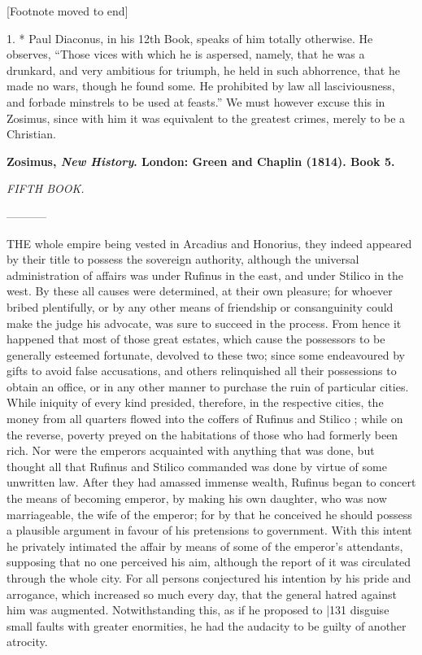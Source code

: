 [Footnote moved to end]

1. * Paul Diaconus, in his 12th Book, speaks of him totally otherwise. He observes, ``Those vices with which he is aspersed, namely, that he was a drunkard, and very ambitious for triumph, he held in such abhorrence, that he made no wars, though he found some. He prohibited by law all lasciviousness, and forbade minstrels to be used at feasts.'' We must however excuse this in Zosimus, since with him it was equivalent to the greatest crimes, merely to be a Christian.


\textbf{Zosimus, \emph{New History}. London: Green and Chaplin
(1814). Book 5.}

\emph{FIFTH BOOK.}

-----------

THE whole empire being vested in Arcadius and Honorius, they indeed appeared by their title to possess the sovereign authority, although the universal administration of affairs was under Rufinus in the east, and under Stilico in the west. By these all causes were determined, at their own pleasure; for whoever bribed plentifully, or by any other means of friendship or consanguinity could make the judge his advocate, was sure to succeed in the process. From hence it happened that most of those great estates, which cause the possessors to be generally esteemed fortunate, devolved to these two; since some endeavoured by gifts to avoid false accusations, and others relinquished all their possessions to obtain an office, or in any other manner to purchase the ruin of particular cities. While iniquity of every kind presided, therefore, in the respective cities, the money from all quarters flowed into the coffers of Rufinus and Stilico ; while on the reverse, poverty preyed on the habitations of those who had formerly been rich. Nor were the emperors acquainted with anything that was done, but thought all that Rufinus and Stilico commanded was done by virtue of some unwritten law. After they had amassed immense wealth, Rufinus began to concert the means of becoming emperor, by making his own daughter, who was now marriageable, the wife of the emperor; for by that he conceived he should possess a plausible argument in favour of his pretensions to government. With this intent he privately
intimated the affair by means of some of the emperor's attendants, supposing that no one perceived his aim, although the
report of it was circulated through the whole city. For all persons conjectured his intention by his pride and arrogance, which increased so much every day, that the general hatred against him was augmented. Notwithstanding this, as if he proposed to
|131 disguise small faults with greater enormities, he had the audacity to be guilty of another atrocity.

